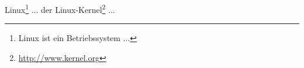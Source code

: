 \documentclass[12pt,a5paper]{article}
\begin{document}
Linux\footnote{Linux ist ein Betriebssystem ...} ...
der Linux-Kernel\footnote{\url{http://www.kernel.org}} ...
\end{document}
